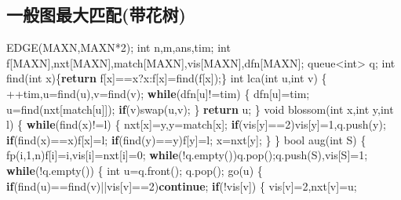\documentclass[
]{article}
\newenvironment{Shaded}{}{}
\newcommand{\ControlFlowTok}[1]{\textcolor[rgb]{0.00,0.44,0.13}{\textbf{#1}}}
\newcommand{\DataTypeTok}[1]{\textcolor[rgb]{0.56,0.13,0.00}{#1}}
\newcommand{\DecValTok}[1]{\textcolor[rgb]{0.25,0.63,0.44}{#1}}
\newcommand{\NormalTok}[1]{#1}
\begin{document}
\hypertarget{ux4e00ux822cux56feux6700ux5927ux5339ux914dux5e26ux82b1ux6811}{%
\subsection{一般图最大匹配(带花树)}\label{ux4e00ux822cux56feux6700ux5927ux5339ux914dux5e26ux82b1ux6811}}

\begin{Shaded}
\begin{Highlighting}[]
\NormalTok{EDGE(MAXN,MAXN*}\DecValTok{2}\NormalTok{);}
\DataTypeTok{int}\NormalTok{ n,m,ans,tim;}
\DataTypeTok{int}\NormalTok{ f[MAXN],nxt[MAXN],match[MAXN],vis[MAXN],dfn[MAXN];}
\NormalTok{queue\textless{}}\DataTypeTok{int}\NormalTok{\textgreater{} q;}
\DataTypeTok{int}\NormalTok{ find(}\DataTypeTok{int}\NormalTok{ x)\{}\ControlFlowTok{return}\NormalTok{ f[x]==x?x:f[x]=find(f[x]);\}}
\DataTypeTok{int}\NormalTok{ lca(}\DataTypeTok{int}\NormalTok{ u,}\DataTypeTok{int}\NormalTok{ v)}
\NormalTok{\{}
\NormalTok{    ++tim,u=find(u),v=find(v);}
    \ControlFlowTok{while}\NormalTok{(dfn[u]!=tim)}
\NormalTok{    \{}
\NormalTok{        dfn[u]=tim;}
\NormalTok{        u=find(nxt[match[u]]);}
        \ControlFlowTok{if}\NormalTok{(v)swap(u,v);}
\NormalTok{    \}}
    \ControlFlowTok{return}\NormalTok{ u;}
\NormalTok{\}}
\DataTypeTok{void}\NormalTok{ blossom(}\DataTypeTok{int}\NormalTok{ x,}\DataTypeTok{int}\NormalTok{ y,}\DataTypeTok{int}\NormalTok{ l)}
\NormalTok{\{}
    \ControlFlowTok{while}\NormalTok{(find(x)!=l)}
\NormalTok{    \{}
\NormalTok{        nxt[x]=y,y=match[x];}
        \ControlFlowTok{if}\NormalTok{(vis[y]==}\DecValTok{2}\NormalTok{)vis[y]=}\DecValTok{1}\NormalTok{,q.push(y);}
        \ControlFlowTok{if}\NormalTok{(find(x)==x)f[x]=l;}
        \ControlFlowTok{if}\NormalTok{(find(y)==y)f[y]=l;}
\NormalTok{        x=nxt[y];}
\NormalTok{    \}}
\NormalTok{\}}
\DataTypeTok{bool}\NormalTok{ aug(}\DataTypeTok{int}\NormalTok{ S)}
\NormalTok{\{}
\NormalTok{    fp(i,}\DecValTok{1}\NormalTok{,n)f[i]=i,vis[i]=nxt[i]=}\DecValTok{0}\NormalTok{;}
    \ControlFlowTok{while}\NormalTok{(!q.empty())q.pop();q.push(S),vis[S]=}\DecValTok{1}\NormalTok{;}
    \ControlFlowTok{while}\NormalTok{(!q.empty())}
\NormalTok{    \{}
        \DataTypeTok{int}\NormalTok{ u=q.front(); q.pop();}
\NormalTok{        go(u)}
\NormalTok{        \{}
            \ControlFlowTok{if}\NormalTok{(find(u)==find(v)||vis[v]==}\DecValTok{2}\NormalTok{)}\ControlFlowTok{continue}\NormalTok{;}
            \ControlFlowTok{if}\NormalTok{(!vis[v])}
\NormalTok{            \{}
\NormalTok{                vis[v]=}\DecValTok{2}\NormalTok{,nxt[v]=u;}

\end{Highlighting}
\end{Shaded}
\end{document}
